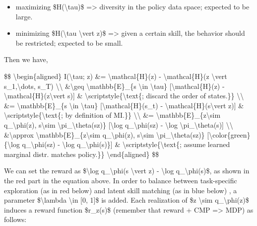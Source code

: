 \begin{itemize}
\tightlist
\item
  maximizing \$H(\textbackslash tau)\$ =\textgreater{} diversity in the policy data space; expected to be large.
\item
  minimizing \$H(\textbackslash tau \textbackslash vert z)\$ =\textgreater{} given a certain skill, the behavior should be restricted; expected to be small.
\end{itemize}

Then we have,

\$\$ \textbackslash begin\{aligned\} I(\textbackslash tau; z) \&= \textbackslash mathcal\{H\}(z) - \textbackslash mathcal\{H\}(z \textbackslash vert s\_1,\textbackslash dots, s\_T) \textbackslash\textbackslash{} \&\textbackslash geq \textbackslash mathbb\{E\}\_\{s \textbackslash in \textbackslash tau\} {[}\textbackslash mathcal\{H\}(z) - \textbackslash mathcal\{H\}(z\textbackslash vert s){]} \& \textbackslash scriptstyle\{\textbackslash text\{; discard the order of states.\}\} \textbackslash\textbackslash{} \&= \textbackslash mathbb\{E\}\_\{s \textbackslash in \textbackslash tau\} {[}\textbackslash mathcal\{H\}(s\_t) - \textbackslash mathcal\{H\}(s\textbackslash vert z){]} \& \textbackslash scriptstyle\{\textbackslash text\{; by definition of MI.\}\} \textbackslash\textbackslash{} \&= \textbackslash mathbb\{E\}\_\{z\textbackslash sim q\_\textbackslash phi(z), s\textbackslash sim \textbackslash pi\_\textbackslash theta(s\textbar z)\} {[}\textbackslash log q\_\textbackslash phi(s\textbar z) - \textbackslash log \textbackslash pi\_\textbackslash theta(s){]} \textbackslash\textbackslash{} \&\textbackslash approx \textbackslash mathbb\{E\}\_\{z\textbackslash sim q\_\textbackslash phi(z), s\textbackslash sim \textbackslash pi\_\textbackslash theta(s\textbar z)\} {[}\textbackslash color\{green\}\{\textbackslash log q\_\textbackslash phi(s\textbar z) - \textbackslash log q\_\textbackslash phi(s)\}{]} \& \textbackslash scriptstyle\{\textbackslash text\{; assume learned marginal distr. matches policy.\}\} \textbackslash end\{aligned\} \$\$

We can set the reward as \$\textbackslash log q\_\textbackslash phi(s \textbackslash vert z) - \textbackslash log q\_\textbackslash phi(s)\$, as shown in the {red} part in the equation above. In order to balance between task-specific exploration (as in {red} below) and latent skill matching (as in {blue} below) , a parameter \$\textbackslash lambda \textbackslash in {[}0, 1{]}\$ is added. Each realization of \$z \textbackslash sim q\_\textbackslash phi(z)\$ induces a reward function \$r\_z(s)\$ (remember that reward + CMP =\textgreater{} MDP) as follows:

